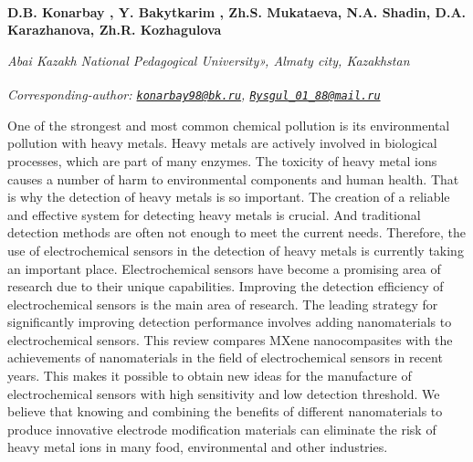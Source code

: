 
\begin{articleheader}

{\bfseries D.B. Konarbay\textsuperscript{\envelope } \alink{},
Y. Bakytkarim\textsuperscript{\envelope } ,
Zh.S. Mukataeva,
N.A. Shadin,
D.A. Karazhanova,
Zh.R. Kozhagulova}
\end{articleheader}

\begin{affiliation}
\emph{Abai Kazakh National Pedagogical University», Almaty city, Kazakhstan}

\raggedright \textsuperscript{\envelope }{\em Corresponding-author: \emph{\href{mailto:konarbay98@bk.ru}{\nolinkurl{konarbay98@bk.ru}}, \href{mailto:Rysgul_01_88@mail.ru}{\nolinkurl{Rysgul\_01\_88@mail.ru}}}}
\end{affiliation}

One of the strongest and most common chemical pollution is its
environmental pollution with heavy metals. Heavy metals are actively
involved in biological processes, which are part of many enzymes. The
toxicity of heavy metal ions causes a number of harm to environmental
components and human health. That is why the detection of heavy metals
is so important. The creation of a reliable and effective system for
detecting heavy metals is crucial. And traditional detection methods are
often not enough to meet the current needs. Therefore, the use of
electrochemical sensors in the detection of heavy metals is currently
taking an important place. Electrochemical sensors have become a
promising area of research due to their unique capabilities. Improving
the detection efficiency of electrochemical sensors is the main area of
research. The leading strategy for significantly improving detection
performance involves adding nanomaterials to electrochemical sensors.
This review compares MXene nanocompasites with the achievements of
nanomaterials in the field of electrochemical sensors in recent years.
This makes it possible to obtain new ideas for the manufacture of
electrochemical sensors with high sensitivity and low detection
threshold. We believe that knowing and combining the benefits of
different nanomaterials to produce innovative electrode modification
materials can eliminate the risk of heavy metal ions in many food,
environmental and other industries.

